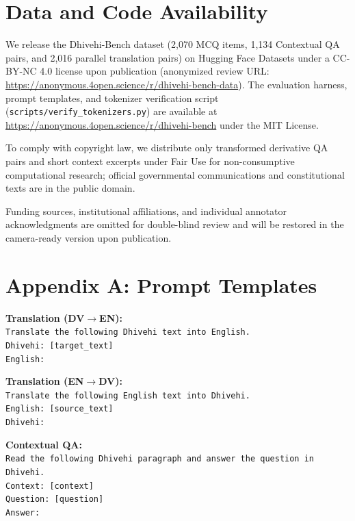 \documentclass[acmsmall,review,anonymous]{acmart}
\begin{document}
\section{Data and Code Availability}
We release the Dhivehi-Bench dataset (2,070 MCQ items, 1,134 Contextual QA pairs, and 2,016 parallel translation pairs) on Hugging Face Datasets under a CC-BY-NC 4.0 license upon publication (anonymized review URL: \url{https://anonymous.4open.science/r/dhivehi-bench-data}). The evaluation harness, prompt templates, and tokenizer verification script (\texttt{scripts/verify\_tokenizers.py}) are available at \url{https://anonymous.4open.science/r/dhivehi-bench} under the MIT License.

To comply with copyright law, we distribute only transformed derivative QA pairs and short context excerpts under Fair Use for non-consumptive computational research; official governmental communications and constitutional texts are in the public domain.

\begin{acks}
Funding sources, institutional affiliations, and individual annotator acknowledgments are omitted for double-blind review and will be restored in the camera-ready version upon publication.
\end{acks}




\section*{Appendix A: Prompt Templates}

\noindent\textbf{Translation (DV$\rightarrow$EN):}\\
\texttt{Translate the following Dhivehi text into English.}\\
\texttt{Dhivehi: [target\_text]}\\
\texttt{English:}

\vspace{6pt}
\noindent\textbf{Translation (EN$\rightarrow$DV):}\\
\texttt{Translate the following English text into Dhivehi.}\\
\texttt{English: [source\_text]}\\
\texttt{Dhivehi:}

\vspace{6pt}
\noindent\textbf{Contextual QA:}\\
\texttt{Read the following Dhivehi paragraph and answer the question in Dhivehi.}\\
\texttt{Context: [context]}\\
\texttt{Question: [question]}\\
\texttt{Answer:}
\end{document}
